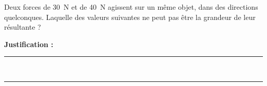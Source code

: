 Deux forces de \qty{30}{N} et de \qty{40}{N} agissent sur un même objet, dans des directions quelconques. Laquelle des valeurs suivantes ne peut pas être la grandeur de leur résultante ?

\choices

\noindent\textbf{Justification :} \hrulefill \\[2.5ex]
\rule{\linewidth}{0.4pt} \\[2.5ex]
\rule{\linewidth}{0.4pt}
\vfill
